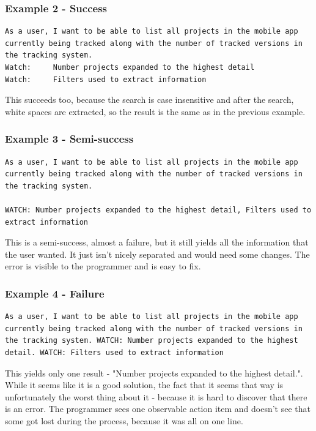\subsubsection*{Example 2 - Success}

\begin{lstlisting}
As a user, I want to be able to list all projects in the mobile app currently being tracked along with the number of tracked versions in the tracking system. 
Watch:     Number projects expanded to the highest detail
Watch:     Filters used to extract information
\end{lstlisting}

This succeeds too, because the search is case insensitive and after the search, white spaces are extracted, so the result is the same as in the previous example.

\subsubsection*{Example 3 - Semi-success}

\begin{lstlisting}
As a user, I want to be able to list all projects in the mobile app currently being tracked along with the number of tracked versions in the tracking system.

WATCH: Number projects expanded to the highest detail, Filters used to extract information
\end{lstlisting}

This is a semi-success, almost a failure, but it still yields all the information that the user wanted. It just isn't nicely separated and would need some changes. The error is visible to the programmer and is easy to fix.

\subsubsection*{Example 4 - Failure}

\begin{lstlisting}
As a user, I want to be able to list all projects in the mobile app currently being tracked along with the number of tracked versions in the tracking system. WATCH: Number projects expanded to the highest detail. WATCH: Filters used to extract information
\end{lstlisting}

This yields only one result - "Number projects expanded to the highest detail.". While it seems like it is a good solution, the fact that it seems that way is unfortunately the worst thing about it - because it is hard to discover that there is an error. The programmer sees one observable action item and doesn't see that some got lost during the process, because it was all on one line.

